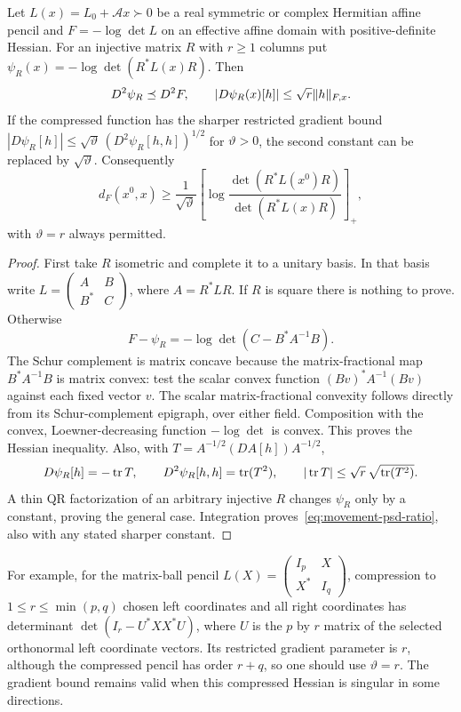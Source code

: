 \begin{proposition}\label{prop:movement-psd-compression}
Let $L(x)=L_0+\mathcal A x\succ0$ be a real symmetric or complex
Hermitian affine pencil and $F=-\log\det L$ on an effective affine
domain with positive-definite Hessian. For an injective matrix $R$ with
$r\geq1$ columns put $\psi_R(x)=-\log\det(R^*L(x)R)$. Then
\begin{equation}\label{eq:movement-psd-contraction}
 D^2\psi_R\preceq D^2F,\qquad
 |D\psi_R(x)[h]|\leq\sqrt r\lVert h\rVert_{F,x}.
\end{equation}
If the compressed function has the sharper restricted gradient bound
$|D\psi_R[h]|\leq\sqrt\vartheta\,(D^2\psi_R[h,h])^{1/2}$ for
$\vartheta>0$, the
second constant can be replaced by $\sqrt\vartheta$. Consequently
\begin{equation}\label{eq:movement-psd-ratio}
 d_F(x^0,x)\geq\frac1{\sqrt\vartheta}
 \left[\log\frac{\det(R^*L(x^0)R)}{\det(R^*L(x)R)}\right]_+,
\end{equation}
with $\vartheta=r$ always permitted.
\end{proposition}
\begin{proof}
First take $R$ isometric and complete it to a unitary basis. In that
basis write $L=\left(\begin{smallmatrix}A&B\\B^*&C\end{smallmatrix}\right)$,
where $A=R^*LR$. If $R$ is square there is nothing to prove. Otherwise
\[
 F-\psi_R=-\log\det(C-B^*A^{-1}B).
\]
The Schur complement is matrix concave because the matrix-fractional
map $B^*A^{-1}B$ is matrix convex: test the scalar convex function
$(Bv)^*A^{-1}(Bv)$ against each fixed vector $v$. The scalar
matrix-fractional convexity follows directly from its Schur-complement
epigraph, over either field. Composition with the convex,
Loewner-decreasing function $-\log\det$ is convex. This proves the
Hessian inequality. Also, with $T=A^{-1/2}(D A[h])A^{-1/2}$,
\[
 D\psi_R[h]=-\operatorname{tr} T,\qquad D^2\psi_R[h,h]=\operatorname{tr}(T^2),\qquad
 |\operatorname{tr} T|\leq\sqrt r\,\sqrt{\operatorname{tr}(T^2)}.
\]
A thin QR factorization of an arbitrary injective $R$ changes
$\psi_R$ only by a constant, proving the general case. Integration
proves~\eqref{eq:movement-psd-ratio}, also with any stated sharper
constant.
\end{proof}
For example, for the matrix-ball pencil
$L(X)=\left(\begin{smallmatrix}I_p&X\\X^*&I_q\end{smallmatrix}\right)$,
compression to $1\leq r\leq\min(p,q)$ chosen left coordinates and all right
coordinates has determinant $\det(I_r-U^*XX^*U)$, where $U$ is the
$p$ by $r$ matrix of the selected orthonormal left coordinate vectors.
Its restricted gradient parameter
is $r$, although the compressed pencil has order $r+q$, so one should
use $\vartheta=r$. The gradient bound remains
valid when this compressed Hessian is singular in some directions.

